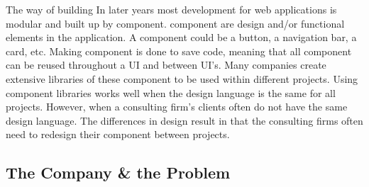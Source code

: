 The way of building
In later years most development for web applications is modular and built up by \gls{component}. \Gls{component} are design and/or functional elements in the application. A component could be a button, a navigation bar, a card\cite{babichSimpleDesignTips2020}, etc. Making \gls{component} is done to save code, meaning that all \gls{component} can be reused throughout a UI and between UI's. Many companies create extensive libraries of these \gls{component} to be used within different projects. Using \gls{component} libraries works well when the design language is the same for all projects. However, when a consulting firm's clients often do not have the same design language. The differences in design result in that the consulting firms often need to redesign their \gls{component} between projects. 





\subsection{The Company \& the Problem}
\label{sub:company}




